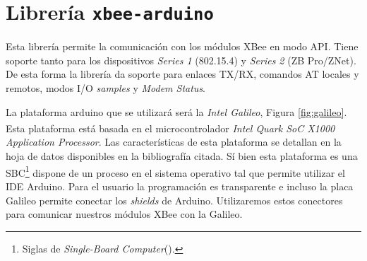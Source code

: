 \documentclass[11pt,oneside,spanish,a4paper]{article}
\begin{document}
\section{Librería \texttt{xbee-arduino}}
\label{sec:lib-xbe-ano}

Esta librería permite la comunicación con los módulos XBee en modo
API. Tiene soporte tanto para los dispositivos \emph{Series 1}
(802.15.4) y \emph{Series 2} (ZB Pro/ZNet). De esta forma la librería
da soporte para enlaces TX/RX, comandos AT locales y remotos, modos
I/O \textsl{samples} y \textsl{Modem Status}\cite{XbeeArduinoGit}.

La plataforma arduino que se utilizará será la \emph{Intel
  Galileo}, Figura \ref{fig:galileo}. Esta plataforma está basada en el microcontrolador
\emph{Intel\textsuperscript{\textregistered{}} Quark SoC X1000 Application
  Processor}. Las características de esta plataforma se detallan en la
hoja de datos disponibles en la bibliografía
citada\cite{GalileoDS}. Sí bien esta plataforma es una
SBC\footnote{Siglas de \textsl{Single-Board
    Computer}().}
dispone de un proceso en el sistema operativo tal que permite utilizar
el IDE Arduino. Para el usuario la programación es transparente e
incluso la placa Galileo permite conectar los \textsl{shields} de
Arduino. Utilizaremos estos conectores para comunicar nuestros módulos
XBee con la Galileo.
\end{document}
